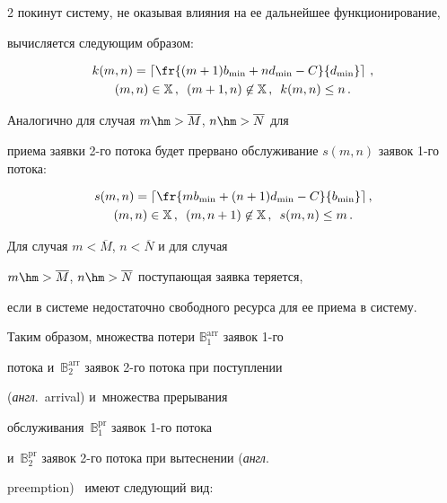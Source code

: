 \begin{multicols}{2}
покинут систему, не оказывая влияния на ее дальнейшее функционирование, 


вычисляется следующим образом:


  \begin{multline*}


  k(m,n)=\left\lceil \fr{(m+1)b_{\min}+nd_{\min}-C}{d_{\min}}\right\rceil\,,\\ 


(m,n)\in\mathbb{X}\,,\enskip (m+1,n)\not\in\mathbb{X}\,,\enskip k(m,n)\leq n\,.


\end{multline*}


  


  Аналогично для случая $m\hm>\overline{M}$, $n\hm> \overline{N}$ для 


при\-ема заявки 2-го потока будет прервано обслуживание $s(m,n)$ заявок 1-го потока:


  \begin{multline*}


  s(m,n)= \left\lceil \fr{mb_{\min}+(n+1)d_{\min}-C}{b_{\min}}\right\rceil,\\ 


(m,n)\in\mathbb{X}\,,\enskip (m,n+1)\not\in\mathbb{X}\,,\enskip s(m,n)\leq m\,.


 \end{multline*}


  


  Для случая $m<\overline{M}$, $n<\overline{N}$ и для случая 


$m\hm>\overline{M}$, $n\hm>\overline{N}$ поступающая заявка теряется, 


если в системе недостаточно свободного ресурса для ее приема в систему.


  


  Таким образом, множества потери $\mathbb{B}_1^{\mathrm{arr}}$ заявок \mbox{1-го}


потока и~$\mathbb{B}_2^{\mathrm{arr}}$ заявок 2-го потока при поступлении 


(\textit{англ}.\ arrival) и~множества прерывания 


обслуживания~$\mathbb{B}_1^{\mathrm{pr}}$ заявок 1-го потока 


и~$\mathbb{B}_2^{\mathrm{pr}}$ заявок 2-го потока при вытеснении (\textit{англ}.\ 


preemption)~\cite{10-mos} имеют сле\-ду\-ющий вид:



\end{multicols}
